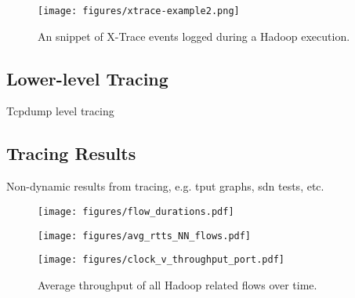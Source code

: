 \begin{figure}
\centering
\texttt{[image: figures/xtrace-example2.png]}
\caption{An snippet of X-Trace events logged during a Hadoop execution.}
\label{fig:xtrace}
\end{figure}

\subsection{Lower-level Tracing}
\label{ssec:low}
Tcpdump level tracing

\subsection{Tracing Results}
\label{ssec:results}
Non-dynamic results from tracing, e.g. tput graphs, sdn tests, etc.

\begin{figure}
\centering
\begin{minipage}{.5\textwidth}
  \centering
  \texttt{[image: figures/flow\_durations.pdf]}
  \label{fig:duration_cdf}
\end{minipage}%
\begin{minipage}{.5\textwidth}
  \centering
  \texttt{[image: figures/avg\_rtts\_NN\_flows.pdf]}
  \label{fig:test2}
\end{minipage}
\end{figure}

\begin{figure}
\centering
\texttt{[image: figures/clock\_v\_throughput\_port.pdf]}
\caption{Average throughput of all Hadoop related flows over time.}
\label{fig:tput}
\end{figure}
